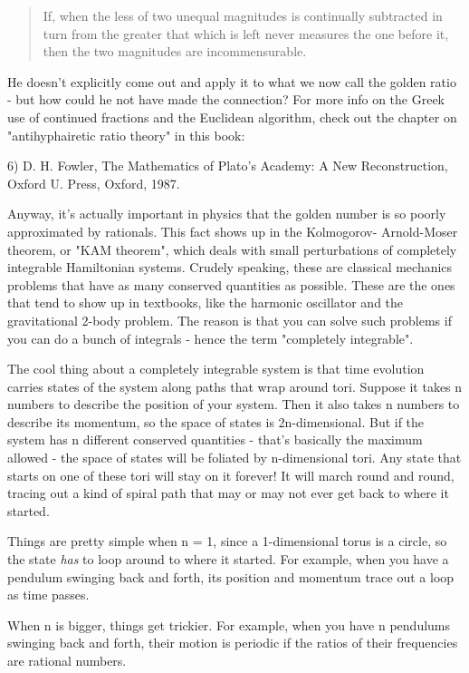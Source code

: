 \begin{quote}
 If, when the less of two unequal magnitudes is continually subtracted 
 in turn from the greater that which is left never measures the one 
 before it, then the two magnitudes are incommensurable.
\end{quote}
He doesn't explicitly come out and apply it to what we now call the golden 
ratio - but how could he not have made the connection?  For more info on 
the Greek use of continued fractions and the Euclidean algorithm, check 
out the chapter on "antihyphairetic ratio theory" in this book:

6) D. H. Fowler, The Mathematics of Plato's Academy: A New Reconstruction,
Oxford U. Press, Oxford, 1987.

Anyway, it's actually important in physics that the golden number is so 
poorly approximated by rationals.   This fact shows up in the Kolmogorov-
Arnold-Moser theorem, or "KAM theorem", which deals with small perturbations 
of completely integrable Hamiltonian systems.  Crudely speaking, these are 
classical mechanics problems that have as many conserved quantities as 
possible.  These are the ones that tend to show up in textbooks, like the 
harmonic oscillator and the gravitational 2-body problem.   The reason is 
that you can solve such problems if you can do a bunch of integrals - hence 
the term "completely integrable".

The cool thing about a completely integrable system is that time evolution 
carries states of the system along paths that wrap around tori.  Suppose it 
takes n numbers to describe the position of your system.  Then it also takes 
n numbers to describe its momentum, so the space of states is 2n-dimensional.
But if the system has n different conserved quantities - that's basically the
maximum allowed - the space of states will be foliated by n-dimensional tori.   
Any state that starts on one of these tori will stay on it forever!  It will 
march round and round, tracing out a kind of spiral path that may or may not 
ever get back to where it started.

Things are pretty simple when n = 1, since a 1-dimensional torus is a 
circle, so the state \emph{has} 
to loop around to where it started.  For example, 
when you have a pendulum swinging back and forth, its position and momentum 
trace out a loop as time passes.  

When n is bigger, things get trickier.  For example, when you have n 
pendulums swinging back and forth, their motion is periodic if the 
ratios of their frequencies are rational numbers.  

